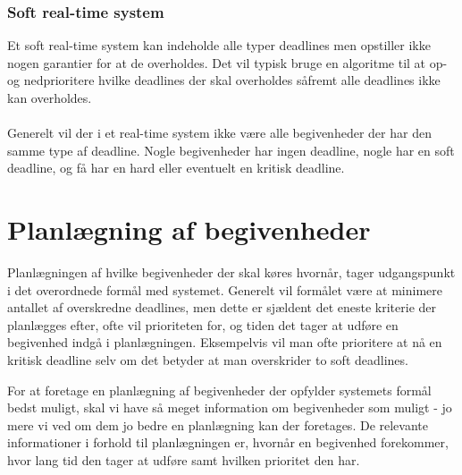 \subsubsection{Soft real-time system}
Et soft real-time system kan indeholde alle typer deadlines men opstiller ikke nogen garantier for at de overholdes. Det vil typisk bruge en algoritme til at op- og nedprioritere hvilke deadlines der skal overholdes såfremt alle deadlines ikke kan overholdes.\\
\\

Generelt vil der i et real-time system ikke være alle begivenheder der har den samme type af deadline. Nogle begivenheder har ingen deadline, nogle har en soft deadline, og få har en hard eller eventuelt en kritisk deadline. 

\section{Planlægning af begivenheder}
Planlægningen af hvilke begivenheder der skal køres hvornår, tager udgangspunkt i det overordnede formål med systemet. Generelt vil formålet være at minimere antallet af overskredne deadlines, men dette er sjældent det eneste kriterie der planlægges efter, ofte vil prioriteten for, og tiden det tager at udføre en begivenhed indgå i planlægningen. Eksempelvis vil man ofte prioritere at nå en kritisk deadline selv om det betyder at man overskrider to soft deadlines. 


For at foretage en planlægning af begivenheder der opfylder systemets formål bedst muligt, skal vi have så meget information om begivenheder som muligt - jo mere vi ved om dem jo bedre en planlægning kan der foretages. De relevante informationer i forhold til planlægningen er, hvornår en begivenhed forekommer, hvor lang tid den tager at udføre samt hvilken prioritet den har. 

